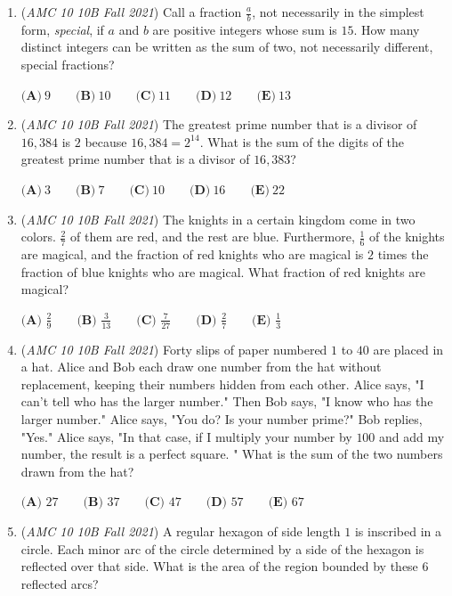 \begin{enumerate}
	\item (\textit{AMC 10 10B Fall 2021}) Call a fraction $\frac{a}{b}$, not necessarily in the simplest form, \textit{special}, if $a$ and $b$ are positive integers whose sum is $15$. How many distinct integers can be written as the sum of two, not necessarily different, special fractions?


 $\textbf{(A)}\ 9 \qquad\textbf{(B)}\  10 \qquad\textbf{(C)}\  11 \qquad\textbf{(D)}\ 12 \qquad\textbf{(E)}\ 13$


	\item (\textit{AMC 10 10B Fall 2021}) The greatest prime number that is a divisor of $16{,}384$ is $2$ because $16{,}384 = 2^{14}$. What is the sum of the digits of the greatest prime number that is a divisor of $16{,}383$?


 $\textbf{(A)} \: 3\qquad\textbf{(B)} \: 7\qquad\textbf{(C)} \: 10\qquad\textbf{(D)} \: 16\qquad\textbf{(E)} \: 22$


	\item (\textit{AMC 10 10B Fall 2021}) The knights in a certain kingdom come in two colors. $\frac{2}{7}$ of them are red, and the rest are blue. Furthermore, $\frac{1}{6}$ of the knights are magical, and the fraction of red knights who are magical is $2$ times the fraction of blue knights who are magical. What fraction of red knights are magical?


 $\textbf{(A) }\frac{2}{9}\qquad\textbf{(B) }\frac{3}{13}\qquad\textbf{(C) }\frac{7}{27}\qquad\textbf{(D) }\frac{2}{7}\qquad\textbf{(E) }\frac{1}{3}$


	\item (\textit{AMC 10 10B Fall 2021}) Forty slips of paper numbered $1$ to $40$ are placed in a hat. Alice and Bob each draw one number from the hat without replacement, keeping their numbers hidden from each other. Alice says, "I can't tell who has the larger number." Then Bob says, "I know who has the larger number." Alice says, "You do? Is your number prime?" Bob replies, "Yes." Alice says, "In that case, if I multiply your number by $100$ and add my number, the result is a perfect square. " What is the sum of the two numbers drawn from the hat?


 $\textbf{(A) }27\qquad\textbf{(B) }37\qquad\textbf{(C) }47\qquad\textbf{(D) }57\qquad\textbf{(E) }67$


	\item (\textit{AMC 10 10B Fall 2021}) A regular hexagon of side length $1{ }$ is inscribed in a circle. Each minor arc of the circle determined by a side of the hexagon is reflected over that side. What is the area of the region bounded by these $6$ reflected arcs?



\end{enumerate}
